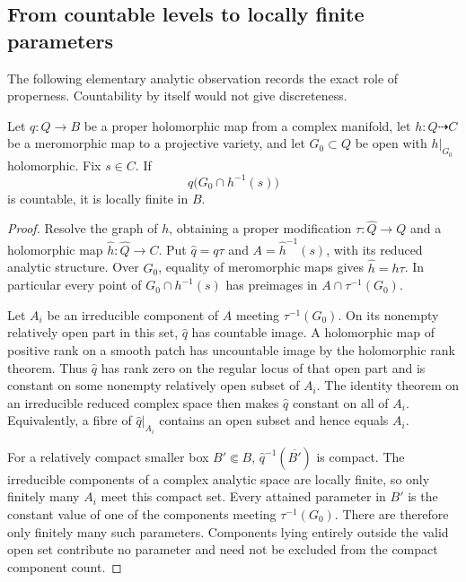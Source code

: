\subsection{From countable levels to locally finite parameters}

The following elementary analytic observation records the exact role of
properness.  Countability by itself would not give discreteness.

\begin{lemma}\label{grp:finite-level-projection}
Let $q:Q\to B$ be a proper holomorphic map from a complex manifold, let
$h:Q\dashrightarrow C$ be a meromorphic map to a projective variety,
and let $G_0\subset Q$ be open with $h|_{G_0}$ holomorphic.  Fix $s\in C$.
If
\[
 q\bigl(G_0\cap h^{-1}(s)\bigr)
\]
is countable, it is locally finite in $B$.
\end{lemma}

\begin{proof}
Resolve the graph of $h$, obtaining a proper modification
$\tau:\widehat Q\to Q$ and a holomorphic map
$\widehat h:\widehat Q\to C$.
Put $\widehat q=q\tau$ and $A=\widehat h^{-1}(s)$, with its reduced
analytic structure.  Over $G_0$, equality of meromorphic maps gives
$\widehat h=h\tau$.  In particular every point of
$G_0\cap h^{-1}(s)$ has preimages in
$A\cap\tau^{-1}(G_0)$.

Let $A_i$ be an irreducible component of $A$ meeting
$\tau^{-1}(G_0)$.  On its nonempty relatively open part in this set,
$\widehat q$ has countable image.  A holomorphic map of positive rank
on a smooth patch has uncountable image by the holomorphic rank theorem.
Thus $\widehat q$ has rank zero on the regular locus of that open part
and is constant on some nonempty relatively open subset of $A_i$.
The identity theorem on an irreducible reduced complex space then makes
$\widehat q$ constant on all of $A_i$.  Equivalently, a fibre of
$\widehat q|_{A_i}$ contains an open subset and hence equals $A_i$.

For a relatively compact smaller box $B'\Subset B$,
$\widehat q^{-1}(\overline{B'})$ is compact.  The irreducible components
of a complex analytic space are locally finite, so only finitely many
$A_i$ meet this compact set.  Every attained parameter in $B'$ is the
constant value of one of the components meeting $\tau^{-1}(G_0)$.
There are therefore only finitely many such parameters.  Components
lying entirely outside the valid open set contribute no parameter and
need not be excluded from the compact component count.
\end{proof}

